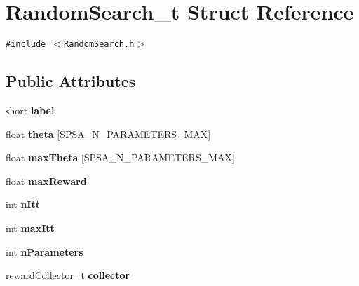 \hypertarget{structRandomSearch__t}{
\section{RandomSearch\_\-t Struct Reference}
\label{structRandomSearch__t}
}
{\tt \#include $<$RandomSearch.h$>$}

\subsection*{Public Attributes}
\begin{CompactItemize}
\item 
\hypertarget{structRandomSearch__t_85fa49f16b79a25adc3f441cd2448534}{
short \textbf{label}}
\label{structRandomSearch__t_85fa49f16b79a25adc3f441cd2448534}

\item 
\hypertarget{structRandomSearch__t_eee4c12477afe728532916ea7366de59}{
float \textbf{theta} \mbox{[}SPSA\_\-N\_\-PARAMETERS\_\-MAX\mbox{]}}
\label{structRandomSearch__t_eee4c12477afe728532916ea7366de59}

\item 
\hypertarget{structRandomSearch__t_9fb4397ddee08973b44922d054b9f3ec}{
float \textbf{maxTheta} \mbox{[}SPSA\_\-N\_\-PARAMETERS\_\-MAX\mbox{]}}
\label{structRandomSearch__t_9fb4397ddee08973b44922d054b9f3ec}

\item 
\hypertarget{structRandomSearch__t_246c89b4c6fb175fe16c8d18e114fbcf}{
float \textbf{maxReward}}
\label{structRandomSearch__t_246c89b4c6fb175fe16c8d18e114fbcf}

\item 
\hypertarget{structRandomSearch__t_d35a336c13f0f4d8681d9d2fe25efe10}{
int \textbf{nItt}}
\label{structRandomSearch__t_d35a336c13f0f4d8681d9d2fe25efe10}

\item 
\hypertarget{structRandomSearch__t_29b27a7fe97f0f92a1d9f56bb8f71bcb}{
int \textbf{maxItt}}
\label{structRandomSearch__t_29b27a7fe97f0f92a1d9f56bb8f71bcb}

\item 
\hypertarget{structRandomSearch__t_b44de1edae8ea149a071a8a0a4de03c9}{
int \textbf{nParameters}}
\label{structRandomSearch__t_b44de1edae8ea149a071a8a0a4de03c9}

\item 
\hypertarget{structRandomSearch__t_1b7da3f8900c4c210c0169483add45e6}{
rewardCollector\_\-t \textbf{collector}}
\label{structRandomSearch__t_1b7da3f8900c4c210c0169483add45e6}

\end{CompactItemize}


